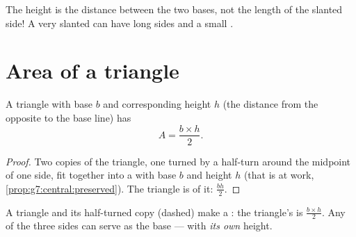 \begin{remark}
The height is the \emph{} distance between the two bases,
not the length of the slanted side! A very slanted  can
have long sides and a small .
\end{remark}

\section{Area of a triangle}

\begin{theorem}[Triangle]\label{thm:g7:areas:triangle}
A triangle with base $b$ and corresponding height $h$ (the
 distance from the opposite  to the base line) has
\[
A = \frac{b \times h}{2} .
\]
\end{theorem}

\begin{proof}
Two copies of the triangle, one turned by a half-turn around the
midpoint of one side, fit together into a  with base $b$
and height $h$ (that is  at work,
\cref{prop:g7:central:preserved}). The triangle is  of it:
$\frac{bh}{2}$.
\end{proof}

\begin{omfigure}

{\small A triangle and its half-turned copy (dashed) make a
: the triangle's  is $\frac{b\times h}{2}$. Any of the
three sides can serve as the base --- with \emph{its own} height.}
\end{omfigure}

